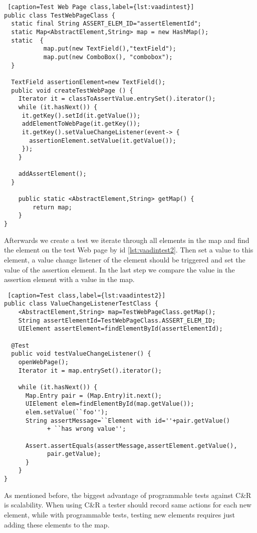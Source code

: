 \lstset{style=a1listing}
\begin{lstlisting} [caption=Test Web Page class,label={lst:vaadintest}]
public class TestWebPageClass {
  static final String ASSERT_ELEM_ID="assertElementId";
  static Map<AbstractElement,String> map = new HashMap();
  static  {
    	   map.put(new TextField(),"textField");
    	   map.put(new ComboBox(), "combobox");
  }
  
  TextField assertionElement=new TextField();
  public void createTestWebPage () {
    Iterator it = classToAssertValue.entrySet().iterator();
  	while (it.hasNext()) {
  	 it.getKey().setId(it.getValue());
  	 addElementToWebPage(it.getKey());
  	 it.getKey().setValueChangeListener(event-> {
  	   assertionElement.setValue(it.getValue());
  	 });
  	}
  	
  	addAssertElement();
  }  
  	
  	public static <AbstractElement,String> getMap() {
  		return map;
  	}
}
\end{lstlisting}
      
Afterwards we create a test we iterate through all elements in the map and
find the element on the test Web page by id \ref{lst:vaadintest2}. Then set a
value to this element, a value change listener of the element should be triggered and set the value
of the assertion element. In the last step we compare the value in the
assertion element with a value in the map.

\lstset{style=a1listing}			
\begin{lstlisting} [caption=Test class,label={lst:vaadintest2}]
public class ValueChangeListenerTestClass {
	<AbstractElement,String> map=TestWebPageClass.getMap();
	String assertElementId=TestWebPageClass.ASSERT_ELEM_ID;
	UIElement assertElement=findElementById(assertElementId);
       
  @Test
  public void testValueChangeListener() {
    openWebPage();
    Iterator it = map.entrySet().iterator();
          
    while (it.hasNext()) {
      Map.Entry pair = (Map.Entry)it.next();
      UIElement elem=findElementById(map.getValue());
      elem.setValue(``foo'');
      String assertMessage=``Element with id=''+pair.getValue()
        	+ ``has wrong value'';
        
      Assert.assertEquals(assertMessage,assertElement.getValue(),
        	pair.getValue);
      }
    }
}
\end{lstlisting}
  
      As mentioned before, the biggest advantage of programmable tests against
      C\&R is scalability. When using C\&R a
      tester should record same actions for each new element, while with 
      programmable tests, testing new elements requires just adding these elements to the map.
      
